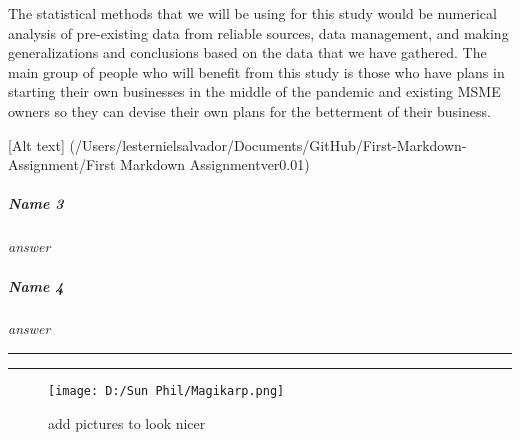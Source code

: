 \documentclass[
]{article}
\begin{document}
The statistical methods that we will be using for this study would be
numerical analysis of pre-existing data from reliable sources, data
management, and making generalizations and conclusions based on the data
that we have gathered. The main group of people who will benefit from
this study is those who have plans in starting their own businesses in
the middle of the pandemic and existing MSME owners so they can devise
their own plans for the betterment of their business.

{[}Alt text{]}
(/Users/lesternielsalvador/Documents/GitHub/First-Markdown-Assignment/First
Markdown Assignmentver0.01)

\hypertarget{name-3}{%
\subparagraph{Name 3}\label{name-3}}

\emph{answer}

\hypertarget{name-4}{%
\subparagraph{Name 4}\label{name-4}}

\emph{answer}

\begin{center}\rule{0.5\linewidth}{0.5pt}\end{center}

\begin{center}\rule{0.5\linewidth}{0.5pt}\end{center}

\begin{figure}
\centering
\texttt{[image: D:/Sun Phil/Magikarp.png]}
\caption{add pictures to look nicer}
\end{figure}
\end{document}
